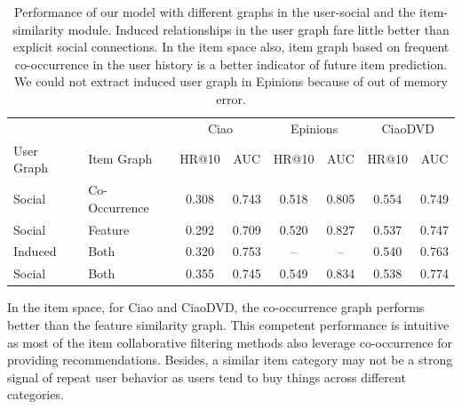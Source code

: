 \begin{table}[h]
    \centering
    \begin{tabular}{l l c c c c c c } \toprule
     & & \multicolumn{2}{c}{Ciao} & \multicolumn{2}{c}{Epinions} & \multicolumn{2}{c}{CiaoDVD}\\
     User Graph & Item Graph &  HR@10   &    AUC         &    HR@10   & AUC &    HR@10   & AUC \\ \hline
    Social & Co-Occurrence & 0.308 & 0.743 & 0.518  & 0.805 & 0.554 & 0.749\\
    Social & Feature & 0.292 & 0.709 & 0.520  & 0.827 & 0.537 & 0.747\\
    Induced & Both & 0.320 & 0.753 & --  & -- & 0.540 & 0.763\\
    Social & Both & 0.355 & 0.745 & 0.549 & 0.834 & 0.538 & 0.774\\
     \bottomrule
    \end{tabular}
\caption{Performance of our model with different graphs in the user-social and the item-similarity module. Induced relationships in the user graph fare little better than explicit social connections. In the item space also, item graph based on frequent co-occurrence in the user history is a better indicator of future item prediction. We could not extract induced user graph in Epinions because of out of memory error.}
\label{tab:graph}
\end{table}

In the item space, for Ciao and CiaoDVD, the co-occurrence graph performs better than the feature similarity graph. This competent performance is intuitive as most of the item collaborative filtering methods also leverage co-occurrence for providing recommendations. Besides, a similar item category may not be a strong signal of repeat user behavior as users tend to buy things across different categories.
